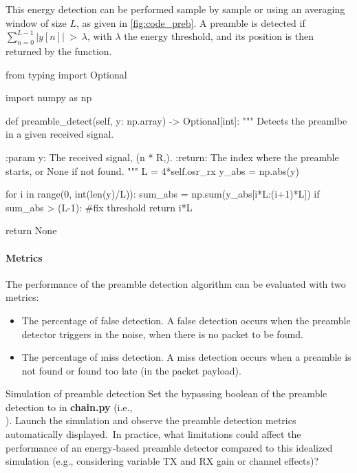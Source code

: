 This energy detection can be performed sample by sample or using an averaging window of size $L$, as given in \autoref{fig:code_preb}. A preamble is detected if $\sum_{n=0}^{L-1}|y[n]| \: > \: \lambda$,
with $\lambda$ the energy threshold, and its position is then returned by the function.

\begin{listing}[H]
\begin{python}
from typing import Optional

import numpy as np

def preamble_detect(self, y: np.array) -> Optional[int]:
    """
    Detects the preamlbe in a given received signal.

    :param y: The received signal, (n * R,).
    :return: The index where the preamble starts,
        or None if not found.
    """
    L = 4*self.osr_rx
    y_abs = np.abs(y)

    for i in range(0, int(len(y)/L)):
        sum_abs = np.sum(y_abs[i*L:(i+1)*L])
        if sum_abs > (L-1): #fix threshold
            return i*L

    return None

\end{python}
\caption{Python code for preamble detection (from \textbf{chain.py}).}
\label{fig:code_preb}
\end{listing}

\paragraph{Metrics} The performance of the preamble detection algorithm can be evaluated with two metrics:
\begin{itemize}
    \item The percentage of false detection. A false detection occurs when the preamble detector triggers in the noise, when there is no packet to be found.
    \item The percentage of miss detection. A miss detection occurs when a preamble is not found or found too late (in the packet payload).
\end{itemize}

\begin{bclogo}[couleur = gray!20, arrondi = 0.2, logo=\bccrayon]{Simulation of preamble detection}
Set the bypassing boolean of the preamble detection to  in \textbf{chain.py}  (i.e.,\\). Launch the simulation and observe the preamble detection metrics automatically displayed.\ In practice, what limitations could affect the performance of an energy-based preamble detector compared to this idealized simulation (e.g., considering variable TX and RX gain or channel effects)?
\end{bclogo}

